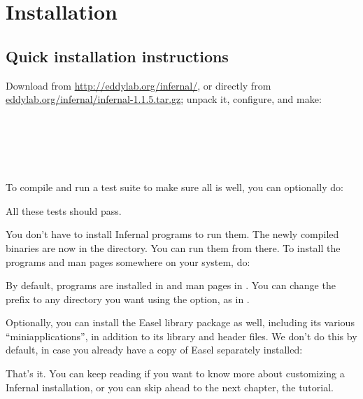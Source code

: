 \section{Installation}
\label{section:installation}
\setcounter{footnote}{0}

\subsection{Quick installation instructions}

Download  from \url{http://eddylab.org/infernal/}, or
directly from \\
\url{eddylab.org/infernal/infernal-1.1.5.tar.gz};
unpack it, configure, and make:

\\
\\
\\
\\ 

To compile and run a test suite to make sure all is well, you can
optionally do:


All these tests should pass.

You don't have to install Infernal programs to run them. The newly
compiled binaries are now in the  directory. You can run
them from there. To install the programs and man pages somewhere on
your system, do:


By default, programs are installed in  and man
pages in . You can change the
 prefix to any directory you want using the
 option, as in .

Optionally, you can install the Easel library package as well,
including its various ``miniapplications'', in addition to its library
and header files. We don't do this by default, in case you already
have a copy of Easel separately installed:


That's it. You can keep reading if you want to know more about
customizing a Infernal installation, or you can skip ahead to the next
chapter, the tutorial.

